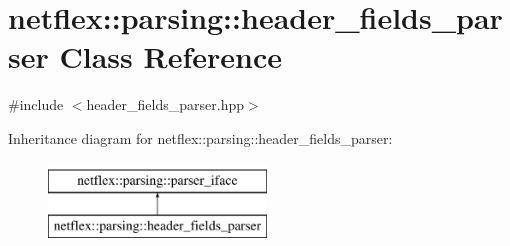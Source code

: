 \hypertarget{classnetflex_1_1parsing_1_1header__fields__parser}{}\section{netflex\+:\+:parsing\+:\+:header\+\_\+fields\+\_\+parser Class Reference}
\label{classnetflex_1_1parsing_1_1header__fields__parser}


{\ttfamily \#include $<$header\+\_\+fields\+\_\+parser.\+hpp$>$}

Inheritance diagram for netflex\+:\+:parsing\+:\+:header\+\_\+fields\+\_\+parser\+:\begin{figure}[H]
\begin{center}
\leavevmode
\includegraphics[height=2.000000cm]{classnetflex_1_1parsing_1_1header__fields__parser}
\end{center}
\end{figure}
